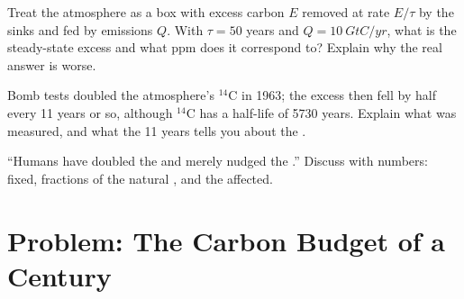 \begin{exercise}[$\star\star\star$]\label{exo:b2:biogeochemical-cycles:10}
Treat the atmosphere as a box with excess carbon $E$ removed at
rate $E/\tau$ by the sinks and fed by emissions $Q$. With $\tau =
50$ years and $Q = \qty{10}{GtC/yr}$, what is the steady-state
excess and what ppm does it correspond to? Explain why the real
answer is worse.
\end{exercise}

\begin{exercise}[$\star\star\star$]\label{exo:b2:biogeochemical-cycles:11}
Bomb tests doubled the atmosphere's $\mathrm{{}^{14}C}$ in 1963; the
excess then fell by half every 11 years or so, although $\mathrm{{}^{14}C}$
has a half-life of 5730 years. Explain what was measured, and what
the 11 years tells you about the .
\end{exercise}

\begin{exercise}[$\star\star\star$]\label{exo:b2:biogeochemical-cycles:12}
``Humans have doubled the  and merely nudged the
.'' Discuss with numbers:  fixed, fractions of
the natural , and the  affected.
\end{exercise}

\section{Problem: The Carbon Budget of a Century}


